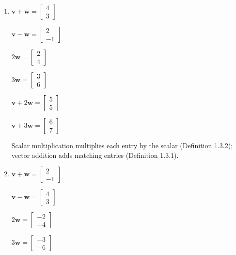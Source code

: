 \begin{solution}
\begin{enumerate}
  \item 
  	\begin{answer}
	$\mathbf{v} + \mathbf{w} = \begin{bmatrix} 4 \\ 3 \end{bmatrix}$
	
	$\mathbf{v} - \mathbf{w} = \begin{bmatrix} 2 \\ -1 \end{bmatrix}$
	
	$2\mathbf{w} = \begin{bmatrix} 2 \\ 4 \end{bmatrix}$
	
	$3\mathbf{w} = \begin{bmatrix} 3 \\ 6 \end{bmatrix}$
	
	$\mathbf{v} + 2\mathbf{w} = \begin{bmatrix} 5 \\ 5 \end{bmatrix}$
	
	$\mathbf{v} + 3\mathbf{w} = \begin{bmatrix} 6 \\ 7 \end{bmatrix}$
	\end{answer}
	
	 Scalar multiplication multiplies each entry by the scalar (Definition 1.3.2); vector addition adds matching entries (Definition 1.3.1).
	
  \item \begin{answer}
	$\mathbf{v} + \mathbf{w} = \begin{bmatrix} 2 \\ -1 \end{bmatrix}$
	
	$\mathbf{v} - \mathbf{w} = \begin{bmatrix} 4 \\ 3 \end{bmatrix}$
	
	$2\mathbf{w} = \begin{bmatrix} -2 \\ -4 \end{bmatrix}$
	
	$3\mathbf{w} = \begin{bmatrix} -3 \\ -6 \end{bmatrix}$
	

\end{answer}
\end{enumerate}
\end{solution}
